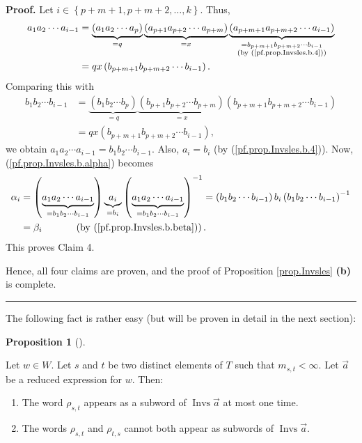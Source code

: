 \documentclass[numbers=enddot,12pt,final,onecolumn,notitlepage,abstracton]{scrartcl}%
\theoremstyle{definition}
\newtheorem{prop}[theo]{Proposition}
\newenvironment{proposition}[1][]
{\begin{prop}[#1]\begin{leftbar}}
{\end{leftbar}\end{prop}}
\newenvironment{proof}[1][Proof]{\noindent\textbf{#1.} }{\ \rule{0.5em}{0.5em}}
\begin{document}
\begin{proof}
Let $i\in\left\{  p+m+1,p+m+2,\ldots,k\right\}  $. Thus,%
\begin{align*}
a_{1}a_{2}\cdots a_{i-1}  &  =\underbrace{\left(  a_{1}a_{2}\cdots
a_{p}\right)  }_{=q}\underbrace{\left(  a_{p+1}a_{p+2}\cdots a_{p+m}\right)
}_{=x}\underbrace{\left(  a_{p+m+1}a_{p+m+2}\cdots a_{i-1}\right)
}_{\substack{=b_{p+m+1}b_{p+m+2}\cdots b_{i-1}\\\text{(by
(\ref{pf.prop.Invsles.b.4}))}}}\\
&  =qx\left(  b_{p+m+1}b_{p+m+2}\cdots b_{i-1}\right)  .
\end{align*}
Comparing this with
\begin{align*}
b_{1}b_{2}\cdots b_{i-1}  &  =\underbrace{\left(  b_{1}b_{2}\cdots
b_{p}\right)  }_{=q}\underbrace{\left(  b_{p+1}b_{p+2}\cdots b_{p+m}\right)
}_{=x}\left(  b_{p+m+1}b_{p+m+2}\cdots b_{i-1}\right) \\
&  =qx\left(  b_{p+m+1}b_{p+m+2}\cdots b_{i-1}\right)  ,
\end{align*}
we obtain $a_{1}a_{2}\cdots a_{i-1}=b_{1}b_{2}\cdots b_{i-1}$. Also,
$a_{i}=b_{i}$ (by (\ref{pf.prop.Invsles.b.4})). Now,
(\ref{pf.prop.Invsles.b.alpha}) becomes%
\begin{align*}
\alpha_{i}  &  =\left(  \underbrace{a_{1}a_{2}\cdots a_{i-1}}_{=b_{1}%
b_{2}\cdots b_{i-1}}\right)  \underbrace{a_{i}}_{=b_{i}}\left(
\underbrace{a_{1}a_{2}\cdots a_{i-1}}_{=b_{1}b_{2}\cdots b_{i-1}}\right)
^{-1}=\left(  b_{1}b_{2}\cdots b_{i-1}\right)  b_{i}\left(  b_{1}b_{2}\cdots
b_{i-1}\right)  ^{-1}\\
&  =\beta_{i}\ \ \ \ \ \ \ \ \ \ \left(  \text{by
(\ref{pf.prop.Invsles.b.beta})}\right)  .
\end{align*}
This proves Claim 4.

Hence, all four claims are proven, and the proof of Proposition
\ref{prop.Invsles} \textbf{(b)} is complete.
\end{proof}

The following fact is rather easy (but will be proven in detail in the next section):

\begin{proposition}
\label{prop.has}Let $w\in W$. Let $s$ and $t$ be two distinct elements of $T$
such that $m_{s,t}<\infty$. Let $\overrightarrow{a}$ be a reduced expression
for $w$. Then:

\begin{enumerate}
\item[\textbf{(a)}] The word $\rho_{s,t}$ appears as a subword of
$\operatorname*{Invs}\overrightarrow{a}$ at most one time.

\item[\textbf{(b)}] The words $\rho_{s,t}$ and $\rho_{t,s}$ cannot both appear
as subwords of $\operatorname*{Invs}\overrightarrow{a}$.
\end{enumerate}
\end{proposition}
\end{document}
